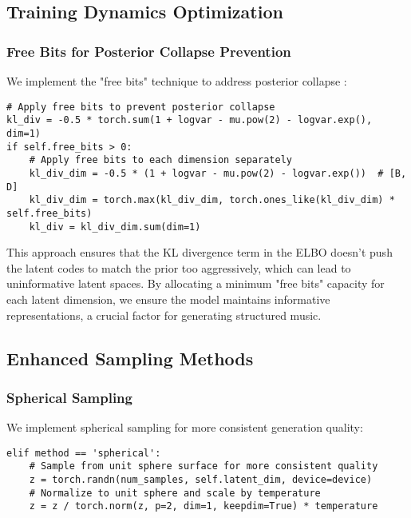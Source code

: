 \documentclass[12pt,a4paper]{article}
\begin{document}
\subsection{Training Dynamics Optimization}

\subsubsection{Free Bits for Posterior Collapse Prevention}

We implement the "free bits" technique to address posterior collapse \cite{kingma2016improved}:

\begin{verbatim}
# Apply free bits to prevent posterior collapse
kl_div = -0.5 * torch.sum(1 + logvar - mu.pow(2) - logvar.exp(), dim=1)
if self.free_bits > 0:
    # Apply free bits to each dimension separately
    kl_div_dim = -0.5 * (1 + logvar - mu.pow(2) - logvar.exp())  # [B, D]
    kl_div_dim = torch.max(kl_div_dim, torch.ones_like(kl_div_dim) * self.free_bits)
    kl_div = kl_div_dim.sum(dim=1)
\end{verbatim}

This approach ensures that the KL divergence term in the ELBO doesn't push the latent codes to match the prior too aggressively, which can lead to uninformative latent spaces. By allocating a minimum "free bits" capacity for each latent dimension, we ensure the model maintains informative representations, a crucial factor for generating structured music.

\subsection{Enhanced Sampling Methods}

\subsubsection{Spherical Sampling}

We implement spherical sampling for more consistent generation quality:

\begin{verbatim}
elif method == 'spherical':
    # Sample from unit sphere surface for more consistent quality
    z = torch.randn(num_samples, self.latent_dim, device=device)
    # Normalize to unit sphere and scale by temperature
    z = z / torch.norm(z, p=2, dim=1, keepdim=True) * temperature
\end{verbatim}
\end{document}
